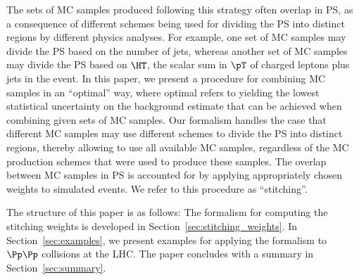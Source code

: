 The sets of MC samples produced following this strategy often overlap in PS,
as a consequence of different schemes being used for dividing the PS into distinct regions by different physics analyses.
For example, one set of MC samples may divide the PS based on the number of jets, 
whereas another set of MC samples may divide the PS based on $\HT$, the scalar sum in $\pT$ of charged leptons plus jets in the event.
In this paper, we present a procedure for combining MC samples in an ``optimal'' way,
where optimal refers to yielding the lowest statistical uncertainty on the background estimate that can be achieved when combining given sets of MC samples.
Our formalism handles the case that different MC samples may use different schemes to divide the PS into distinct regions,
thereby allowing to use all available MC samples, regardless of the MC production schemes that were used to produce these samples.
The overlap between MC samples in PS is accounted for by applying appropriately chosen weights to simulated events.
We refer to this procedure as ``stitching''.

The structure of this paper is as follows:
The formalism for computing the stitching weights is developed in Section~\ref{sec:stitching_weights}.
In Section~\ref{sec:examples}, we present examples for applying the formalism to $\Pp\Pp$ collisions at the LHC.
The paper concludes with a summary in Section~\ref{sec:summary}.
